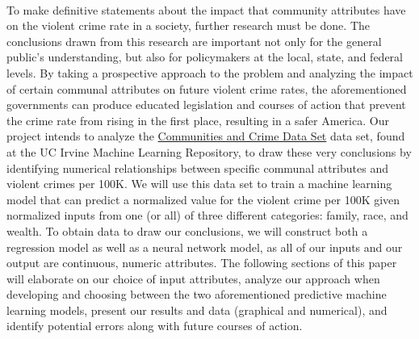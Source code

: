 \documentclass[letterpaper, 11 pt, conference]{article}
\begin{document}
\\To make definitive statements about the impact that community attributes have on the violent crime rate in a society, further research must be done. The conclusions drawn from this research are important not only for the general public's understanding, but also for policymakers at the local, state, and federal levels. By taking a prospective approach to the problem and analyzing the impact of certain communal attributes on future violent crime rates, the aforementioned governments can produce educated legislation and courses of action that prevent the crime rate from rising in the first place, resulting in a safer America. Our project intends to analyze the \href{https://archive.ics.uci.edu/ml/datasets/Communities+and+Crime} {Communities and Crime Data Set} data set, found at the UC Irvine Machine Learning Repository, to draw these very conclusions by identifying numerical relationships between specific communal attributes and violent crimes per 100K. We will use this data set to train a machine learning model that can predict a normalized value for the violent crime per 100K given normalized inputs from one (or all) of three different categories: family, race, and wealth. To obtain data to draw our conclusions, we will construct both a regression model as well as a neural network model, as all of our inputs and our output are continuous, numeric attributes. The following sections of this paper will elaborate on our choice of input attributes, analyze our approach when developing and choosing between the two aforementioned predictive machine learning models, present our results and data (graphical and numerical), and identify potential errors along with future courses of action.
\end{document}
